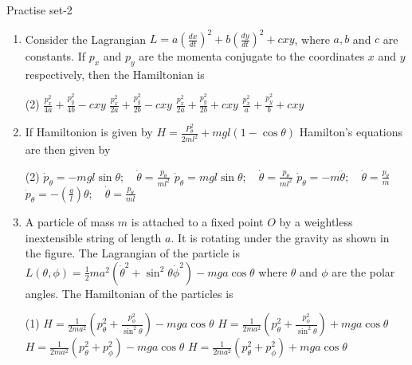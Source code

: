 \newpage
\begin{abox}
	Practise set-2
\end{abox}
\begin{enumerate}
	\item Consider the Lagrangian $L=a\left(\frac{d x}{d t}\right)^{2}+b\left(\frac{d y}{d t}\right)^{2}+c x y$, where $a, b$ and $c$ are constants. If $p_{x}$ and $p_{y}$ are the momenta conjugate to the coordinates $x$ and $y$ respectively, then the Hamiltonian is
	{}
	\begin{tasks}(2)
		\task[\textbf{a.}]$\frac{p_{x}^{2}}{4 a}+\frac{p_{y}^{2}}{4 b}-c x y$
		\task[\textbf{b.}]$\frac{p_{x}^{2}}{2 a}+\frac{p_{y}^{2}}{2 b}-c x y$
		\task[\textbf{c.}]$\frac{p_{x}^{2}}{2 a}+\frac{p_{y}^{2}}{2 b}+c x y$
		\task[\textbf{d.}] $\frac{p_{x}^{2}}{a}+\frac{p_{y}^{2}}{b}+c x y$
	\end{tasks}
	\item  If Hamiltonion is given by $H=\frac{P_{\theta}^{2}}{2 m l^{2}}+m g l(1-\cos \theta)$ Hamilton's equations are then given by
	{}
	\begin{tasks}(2)
		\task[\textbf{a.}] $\dot{p}_{\theta}=-m g l \sin \theta ; \quad \dot{\theta}=\frac{p_{\theta}}{m l^{2}}$
		\task[\textbf{b.}]$\dot{p}_{\theta}=m g l \sin \theta ; \quad \dot{\theta}=\frac{p_{\theta}}{m l^{2}}$
		\task[\textbf{c.}]$\dot{p}_{\theta}=-m \ddot{\theta} ; \quad \dot{\theta}=\frac{p_{\theta}}{m}$
		\task[\textbf{d.}] $\dot{p}_{\theta}=-\left(\frac{g}{l}\right) \theta ; \quad \dot{\theta}=\frac{p_{\theta}}{m l}$
	\end{tasks}
	\item  A particle of mass $m$ is attached to a fixed point $O$ by a weightless inextensible string of length $a$. It is rotating under the gravity as shown in the figure. The Lagrangian of the particle is
	$L(\theta, \phi)=\frac{1}{2} m a^{2}\left(\dot{\theta}^{2}+\sin ^{2} \theta \dot{\phi}^{2}\right)-m g a \cos \theta$ where $\theta$ and $\phi$ are the polar angles. The Hamiltonian of the particles is
	{}
	\begin{tasks}(1)
		\task[\textbf{a.}]$H=\frac{1}{2 m a^{2}}\left(p_{\theta}^{2}+\frac{p_{\phi}^{2}}{\sin ^{2} \theta}\right)-m g a \cos \theta$
		\task[\textbf{b.}]$H=\frac{1}{2 m a^{2}}\left(p_{\theta}^{2}+\frac{p_{\phi}^{2}}{\sin ^{2} \theta}\right)+m g a \cos \theta$
		\task[\textbf{c.}]$H=\frac{1}{2 m a^{2}}\left(p_{\theta}^{2}+p_{\phi}^{2}\right)-m g a \cos \theta$
		\task[\textbf{d.}] $H=\frac{1}{2 m a^{2}}\left(p_{\theta}^{2}+p_{\phi}^{2}\right)+m g a \cos \theta$

\end{tasks}
\end{enumerate}
